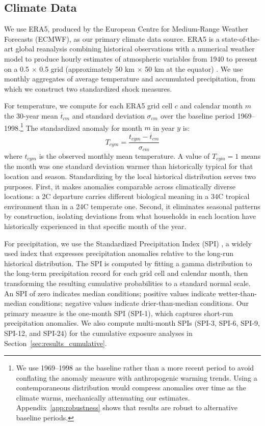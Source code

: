 \documentclass[a4paper]{article}
\begin{document}
\subsection{Climate Data} \label{sec:data_climate}

We use ERA5, produced by the European Centre for Medium-Range Weather Forecasts (ECMWF), as our primary climate data source. ERA5 is a state-of-the-art global reanalysis combining historical observations with a numerical weather model to produce hourly estimates of atmospheric variables from 1940 to present on a 0.5\textdegree{} $\times$ 0.5\textdegree{} grid (approximately 50 km $\times$ 50 km at the equator) \parencite{hersbach2020}. We use monthly aggregates of average temperature and accumulated precipitation, from which we construct two standardized shock measures.

For temperature, we compute for each ERA5 grid cell $c$ and calendar month $m$ the 30-year mean $\overline{t}_{cm}$ and standard deviation $\sigma_{cm}$ over the baseline period 1969--1998.\footnote{We use 1969--1998 as the baseline rather than a more recent period to avoid conflating the anomaly measure with anthropogenic warming trends. Using a contemporaneous distribution would compress anomalies over time as the climate warms, mechanically attenuating our estimates. Appendix~\ref{app:robustness} shows that results are robust to alternative baseline periods.} The standardized anomaly for month $m$ in year $y$ is:
%
\[ T_{cym} = \frac{t_{cym} - \overline{t}_{cm}}{\sigma_{cm}} \]
%
where $t_{cym}$ is the observed monthly mean temperature. A value of $T_{cym} = 1$ means the month was one standard deviation warmer than historically typical for that location and season. Standardizing by the local historical distribution serves two purposes. First, it makes anomalies comparable across climatically diverse locations: a 2\textdegree C departure carries different biological meaning in a 34\textdegree C tropical environment than in a 24\textdegree C temperate one. Second, it eliminates seasonal patterns by construction, isolating deviations from what households in each location have historically experienced in that specific month of the year.

For precipitation, we use the Standardized Precipitation Index (SPI) \parencite{mckee1993}, a widely used index that expresses precipitation anomalies relative to the long-run historical distribution. The SPI is computed by fitting a gamma distribution to the long-term precipitation record for each grid cell and calendar month, then transforming the resulting cumulative probabilities to a standard normal scale. An SPI of zero indicates median conditions; positive values indicate wetter-than-median conditions; negative values indicate drier-than-median conditions. Our primary measure is the one-month SPI (SPI-1), which captures short-run precipitation anomalies. We also compute multi-month SPIs (SPI-3, SPI-6, SPI-9, SPI-12, and SPI-24) for the cumulative exposure analyses in Section~\ref{sec:results_cumulative}.
\end{document}
